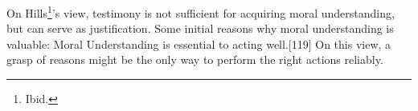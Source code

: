 \documentclass[phdthesis,12pt,final]{wuthesis}
\theoremstyle{definition}
\theoremstyle{definition}
\theoremstyle{definition}
\theoremstyle{definition}
\theoremstyle{remark}
\begin{document}
\begin{Shaded}
\begin{Highlighting}[]

\end{Highlighting}
\end{Shaded}

\begin{Shaded}
\begin{Highlighting}[]

\end{Highlighting}
\end{Shaded}

\begin{Shaded}
\begin{Highlighting}[]

\end{Highlighting}
\end{Shaded}

\begin{Shaded}
\begin{Highlighting}[]

\end{Highlighting}
\end{Shaded}

\begin{Shaded}
\begin{Highlighting}[]

\end{Highlighting}
\end{Shaded}

On Hills\footnote{Ibid.}'s view, testimony is not sufficient for acquiring moral understanding, but can serve as justification. Some initial reasons why moral understanding is valuable: Moral Understanding is essential to acting well.{[}119{]} On this view, a grasp of reasons might be the only way to perform the right actions reliably.
\end{document}
